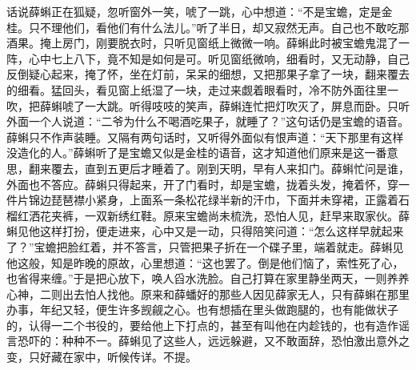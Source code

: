 


\begin{parag}
    话说薛蝌正在狐疑，忽听窗外一笑，唬了一跳，心中想道：“不是宝蟾，定是金桂。只不理他们，看他们有什么法儿。”听了半日，却又寂然无声。自己也不敢吃那酒果。掩上房门，刚要脱衣时，只听见窗纸上微微一响。薛蝌此时被宝蟾鬼混了一阵，心中七上八下，竟不知是如何是可。听见窗纸微响，细看时，又无动静，自己反倒疑心起来，掩了怀，坐在灯前，呆呆的细想，又把那果子拿了一块，翻来覆去的细看。猛回头，看见窗上纸湿了一块，走过来觑着眼看时，冷不防外面往里一吹，把薛蝌唬了一大跳。听得吱吱的笑声，薛蝌连忙把灯吹灭了，屏息而卧。只听外面一个人说道：“二爷为什么不喝酒吃果子，就睡了？”这句话仍是宝蟾的语音。薛蝌只不作声装睡。又隔有两句话时，又听得外面似有恨声道：“天下那里有这样没造化的人。”薛蝌听了是宝蟾又似是金桂的语音，这才知道他们原来是这一番意思，翻来覆去，直到五更后才睡着了。刚到天明，早有人来扣门。薛蝌忙问是谁，外面也不答应。薛蝌只得起来，开了门看时，却是宝蟾，拢着头发，掩着怀，穿一件片锦边琵琶襟小紧身，上面系一条松花绿半新的汗巾，下面并未穿裙，正露着石榴红洒花夹裤，一双新绣红鞋。原来宝蟾尚未梳洗，恐怕人见，赶早来取家伙。薛蝌见他这样打扮，便走进来，心中又是一动，只得陪笑问道：“怎么这样早就起来了？”宝蟾把脸红着，并不答言，只管把果子折在一个碟子里，端着就走。薛蝌见他这般，知是昨晚的原故，心里想道：“这也罢了。倒是他们恼了，索性死了心，也省得来缠。”于是把心放下，唤人舀水洗脸。自己打算在家里静坐两天，一则养养心神，二则出去怕人找他。原来和薛蟠好的那些人因见薛家无人，只有薛蝌在那里办事，年纪又轻，便生许多觊觎之心。也有想插在里头做跑腿的，也有能做状子的，认得一二个书役的，要给他上下打点的，甚至有叫他在内趁钱的，也有造作谣言恐吓的：种种不一。薛蝌见了这些人，远远躲避，又不敢面辞，恐怕激出意外之变，只好藏在家中，听候传详。不提。
\end{parag}


